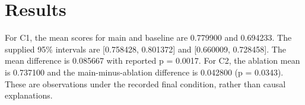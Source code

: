 \section{Results}
For C1, the mean scores for main and baseline are 0.779900 and 0.694233. The supplied 95\% intervals are [0.758428, 0.801372] and [0.660009, 0.728458]. The mean difference is 0.085667 with reported p = 0.0017. For C2, the ablation mean is 0.737100 and the main-minus-ablation difference is 0.042800 (p = 0.0343). These are observations under the recorded final condition, rather than causal explanations.
